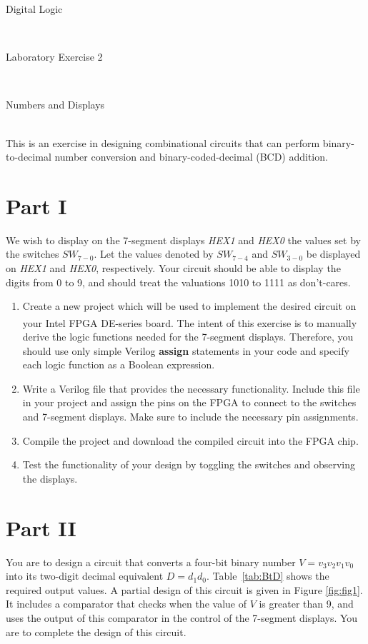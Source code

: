 \documentclass[epsfig,10pt,fullpage]{article}
\newcommand{\LabNum}{2}
\begin{document}
\centerline{\huge Digital Logic}
~\\
\centerline{\huge Laboratory Exercise \LabNum}
~\\
\centerline{\large Numbers and Displays}
~\\

This is an exercise in designing combinational circuits that can perform
binary-to-decimal number conversion and binary-coded-decimal (BCD) addition.
~\\

\section*{Part I}
We wish to display on the 7-segment displays {\it HEX1} and {\it HEX0} the 
values set by the switches $SW_{7-0}$. 
Let the values denoted by $SW_{7-4}$ and $SW_{3-0}$ be displayed on {\it HEX1} and {\it HEX0}, 
respectively.
Your circuit should be able to display the digits from 0 to 9, and should treat the
valuations 1010 to 1111 as don't-cares.

\begin{enumerate}
\item Create a new project which will be used to implement the desired
circuit on your Intel\textsuperscript{\textregistered} FPGA DE-series board. The intent of this exercise is to manually 
derive the logic functions needed for the 7-segment displays. Therefore, you should use only
simple Verilog {\bf assign} statements in your code and specify each logic function as
a Boolean expression.
\item Write a Verilog file that provides the necessary functionality. Include this 
file in your project and assign the pins on the FPGA to connect to the 
switches and 7-segment displays. Make sure to include the necessary pin assignments.
\item Compile the project and download the compiled circuit into the FPGA
chip.
\item Test the functionality of your design by toggling the switches
and observing the displays.
\end{enumerate}

\section*{Part II}
You are to design a circuit that converts a four-bit binary number $V = v_3 v_2 v_1 v_0$
into its two-digit decimal equivalent $D = d_1 d_0$. Table~\ref{tab:BtD} shows the required output
values. A partial design of this circuit is given in Figure \ref{fig:fig1}. It includes a comparator
that checks when the value of $V$ is greater than 9, and uses the output of this
comparator in the control of the 7-segment displays. You are to complete the design of
this circuit. 
\end{document}
